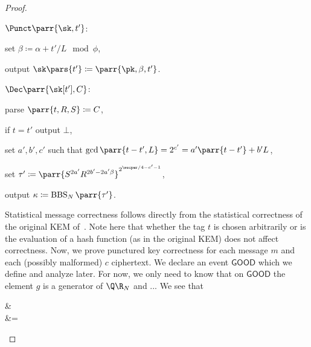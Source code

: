 \begin{proof}
\begin{sitemize}
        \item \(\Punct\parr{\sk,t'}\):
        \begin{sitemize}
            \item set \(\beta \coloneqq \alpha + t'/L \mod \phi\),
            \item output \(\sk\pars{t'} \coloneqq \parr{\pk,\beta,t'}\).
        \end{sitemize}
        \item \(\Dec\parr{\sk[t'],C}\):
        \begin{sitemize}
            \item parse \(\parr{t,R,S} \coloneqq C\),
            \item if \(t = t'\) output \(\bot\),
            \item set \(a',b',c'\) such that \(\gcd\parr{t-t',L} = 2^{c'} = a' \parr{t-t'} + b' L\),
            \item set \(\tau' \coloneqq \parr{S^{2a'} R^{2b'-2a'\beta}}^{2^{\secpar/4-c'-1}}\),
            \item output \(\kappa \coloneqq \operatorname{BBS}_N\parr{\tau'}\).
        \end{sitemize}
    \end{sitemize}
    Statistical message correctness follows directly from the statistical correctness of the original KEM of~\cite{EC:HofKil09}.
    Note here that whether the tag \(t\) is chosen arbitrarily or is the evaluation of a hash function (as in the original KEM) does not affect correctness.
    Now, we prove punctured key correctness for each message \(m\) and each (possibly malformed) \(c\) ciphertext.
    We declare an event \(\textsf{GOOD}\) which we define and analyze later.
    For now, we only need to know that on \(\textsf{GOOD}\) the element \(g\) is a generator of \(\Q\R_N\) and ...
    We see that
    \begin{bralign}
        &
        \\
        &=

\end{bralign}
\end{proof}
